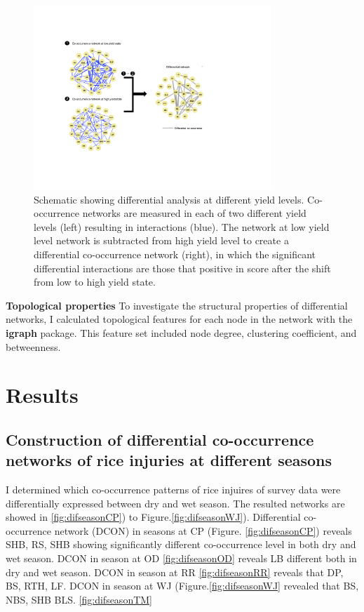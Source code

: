 \begin{figure}
\centering
\includegraphics[width = 0.8\textwidth]{figures/pipeline4.pdf}
\caption{Schematic showing differential analysis at different yield levels. Co-occurrence networks are measured in each of two different yield levels (left) resulting in interactions (blue). The network at low yield level network is subtracted from high yield level to create a differential co-occurrence network (right), in which the significant differential interactions are those that positive in score after the shift from low to high yield state.}
\label{fig:pipeline4}
\end{figure} 

\textbf{Topological properties}
To investigate the structural properties of differential networks, I calculated topological features for each node in the network with the \textbf{igraph} package. This feature set included node degree, clustering coefficient, and betweenness. 


\section{Results}

\subsection{Construction of differential co-occurrence networks of rice injuries at different seasons}

I determined which co-occurrence patterns of rice injuires of survey data were differentially expressed between dry and wet season. The resulted networks are showed in \ref{fig:difseasonCP}) to Figure.\ref{fig:difseasonWJ}). Differential co-occurrence network (DCON) in seasons at CP (Figure. \ref{fig:difseasonCP}) reveals SHB, RS, SHB showing significantly different co-occurrence level in both dry and wet season. DCON in season at OD \ref{fig:difseasonOD}
reveals LB different both in dry and wet season. DCON in season at RR \ref{fig:difseasonRR}  reveals that DP, BS, RTH, LF. DCON in season at WJ (Figure.\ref{fig:difseasonWJ} revealed that  BS, NBS, SHB BLS. \ref{fig:difseasonTM}

